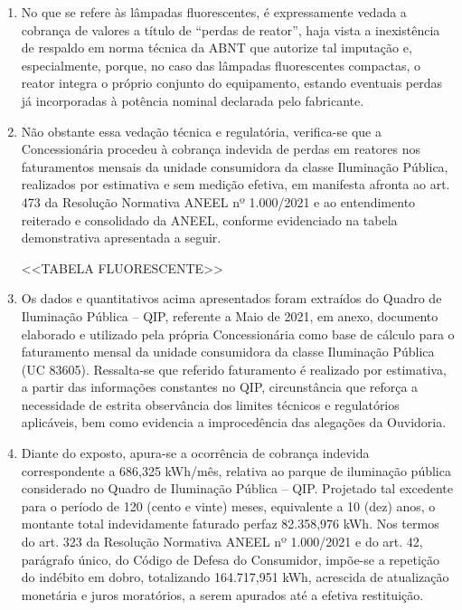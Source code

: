 \begin{enumerate}[resume]
\ifperdaFluorescente
\item %
No que se refere às lâmpadas fluorescentes, é expressamente vedada a cobrança de valores a título de “perdas de reator”, haja vista a inexistência de respaldo em norma técnica da ABNT que autorize tal imputação e, especialmente, porque, no caso das lâmpadas fluorescentes compactas, o reator integra o próprio conjunto do equipamento, estando eventuais perdas já incorporadas à potência nominal declarada pelo fabricante. 

\item %
Não obstante essa vedação técnica e regulatória, verifica-se que a Concessionária procedeu à cobrança indevida de perdas em reatores nos faturamentos mensais da unidade consumidora da classe Iluminação Pública, realizados por estimativa e sem medição efetiva, em manifesta afronta ao art. 473 da Resolução Normativa ANEEL nº 1.000/2021 e ao entendimento reiterado e consolidado da ANEEL, conforme evidenciado na tabela demonstrativa apresentada a seguir.

<<TABELA FLUORESCENTE>> %
\fi

\item
Os dados e quantitativos acima apresentados foram extraídos do Quadro de Iluminação Pública – QIP, referente a Maio de 2021, em anexo, documento elaborado e utilizado pela própria Concessionária como base de cálculo para o faturamento mensal da unidade consumidora da classe Iluminação Pública (UC 83605). Ressalta-se que referido faturamento é realizado por estimativa, a partir das informações constantes no QIP, circunstância que reforça a necessidade de estrita observância dos limites técnicos e regulatórios aplicáveis, bem como evidencia a improcedência das alegações da Ouvidoria.

\item
Diante do exposto, apura-se a ocorrência de cobrança indevida correspondente a 686,325 kWh/mês, relativa ao parque de iluminação pública considerado no Quadro de Iluminação Pública – QIP. Projetado tal excedente para o período de 120 (cento e vinte) meses, equivalente a 10 (dez) anos, o montante total indevidamente faturado perfaz 82.358,976 kWh. Nos termos do art. 323 da Resolução Normativa ANEEL nº 1.000/2021 e do art. 42, parágrafo único, do Código de Defesa do Consumidor, impõe-se a repetição do indébito em dobro, totalizando 164.717,951 kWh, acrescida de atualização monetária e juros moratórios, a serem apurados até a efetiva restituição.


\end{enumerate}
